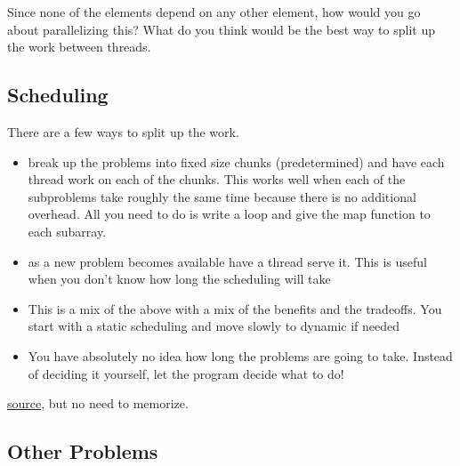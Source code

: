 \begin{aside}
Since none of the elements depend on any other element, how would you go about parallelizing this? What do you think would be the best way to split up the work between threads.

\subsection{Scheduling}\label{scheduling}

There are a few ways to split up the work. 

\begin{itemize}
\item {} break up the problems into fixed size chunks (predetermined) and have each thread work on each of the chunks. This works well when each of the subproblems take roughly the same time because there is no additional overhead. All you need to do is write a loop and give the map function to each subarray. 
\item {} as a new problem becomes available have a thread serve it. This is useful when you don't know how long the scheduling will take 
\item {} This is a mix of the above with a mix of the benefits and the tradeoffs. You start with a static scheduling and move slowly to dynamic if needed 
\item {} You have absolutely no idea how long the problems are going to take. Instead of deciding it yourself, let the program decide what to do!
\end{itemize}

\href{https://software.intel.com/en-us/articles/openmp-loop-scheduling}{source}, but no need to memorize.


\subsection{Other Problems}\label{other-problems}


\end{aside}
